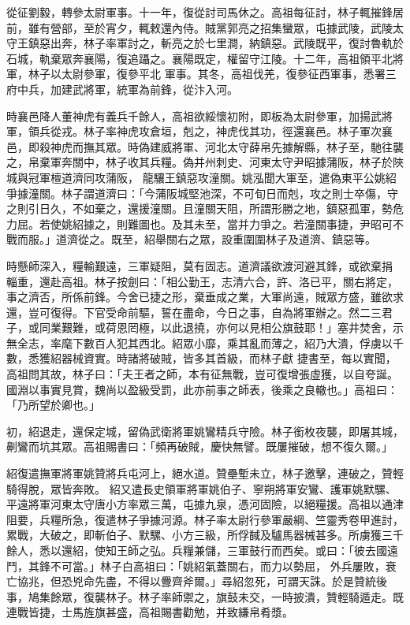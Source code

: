 \begin{pinyinscope}
 從征劉毅，轉參太尉軍事。十一年，復從討司馬休之。高祖每征討，林子輒摧鋒居前，雖有營部，至於宵夕，輒敕還內侍。賊黨郭亮之招集蠻眾，屯據武陵，武陵太守王鎮惡出奔，林子率軍討之，斬亮之於七里澗，納鎮惡。武陵既平，復討魯軌於石城，軌棄眾奔襄陽，復追躡之。襄陽既定，權留守江陵。十二年，高祖領平北將軍，林子以太尉參軍，復參平北
 軍事。其冬，高祖伐羌，復參征西軍事，悉署三府中兵，加建武將軍，統軍為前鋒，從汴入河。



 時襄邑降人董神虎有義兵千餘人，高祖欲綏懷初附，即板為太尉參軍，加揚武將軍，領兵從戎。林子率神虎攻倉垣，剋之，神虎伐其功，徑還襄邑。林子軍次襄邑，即殺神虎而撫其眾。時偽建威將軍、河北太守薛帛先據解縣，林子至，馳往襲之，帛棄軍奔關中，林子收其兵糧。偽并州刺史、河東太守尹昭據蒲阪，林子於陜城與冠軍檀道濟同攻蒲阪，
 龍驤王鎮惡攻潼關。姚泓聞大軍至，遣偽東平公姚紹爭據潼關。林子謂道濟曰：「今蒲阪城堅池深，不可旬日而剋，攻之則士卒傷，守之則引日久，不如棄之，還援潼關。且潼關天阻，所謂形勝之地，鎮惡孤軍，勢危力屈。若使姚紹據之，則難圖也。及其未至，當并力爭之。若潼關事捷，尹昭可不戰而服。」道濟從之。既至，紹舉關右之眾，設重圍圍林子及道濟、鎮惡等。



 時懸師深入，糧輸艱遠，三軍疑阻，莫有固志。道濟議欲渡河避其鋒，或欲棄捐
 輜重，還赴高祖。林子按劍曰：「相公勤王，志清六合，許、洛已平，關右將定，事之濟否，所係前鋒。今舍已捷之形，棄垂成之業，大軍尚遠，賊眾方盛，雖欲求還，豈可復得。下官受命前驅，誓在盡命，今日之事，自為將軍辦之。然二三君子，或同業艱難，或荷恩罔極，以此退撓，亦何以見相公旗鼓耶！」塞井焚舍，示無全志，率麾下數百人犯其西北。紹眾小靡，乘其亂而薄之，紹乃大潰，俘虜以千數，悉獲紹器械資實。時諸將破賊，皆多其首級，而林子獻
 捷書至，每以實聞，高祖問其故，林子曰：「夫王者之師，本有征無戰，豈可復增張虛獲，以自夸誕。國淵以事實見賞，魏尚以盈級受罰，此亦前事之師表，後乘之良轍也。」高祖曰：「乃所望於卿也。」



 初，紹退走，還保定城，留偽武衛將軍姚鸞精兵守險。林子銜枚夜襲，即屠其城，劓鸞而坑其眾。高祖賜書曰：「頻再破賊，慶快無譬。既屢摧破，想不復久爾。」



 紹復遣撫軍將軍姚贊將兵屯河上，絕水道。贊壘塹未立，林子邀擊，連破之，贊輕騎得脫，眾皆奔敗。
 紹又遣長史領軍將軍姚伯子、寧朔將軍安鸞、護軍姚默騾、平遠將軍河東太守唐小方率眾三萬，屯據九泉，憑河固險，以絕糧援。高祖以通津阻要，兵糧所急，復遣林子爭據河源。林子率太尉行參軍嚴綱、竺靈秀卷甲進討，累戰，大破之，即斬伯子、默騾、小方三級，所俘馘及驢馬器械甚多。所虜獲三千餘人，悉以還紹，使知王師之弘。兵糧兼儲，三軍鼓行而西矣。或曰：「彼去國遠鬥，其鋒不可當。」林子白高祖曰：「姚紹氣蓋關右，而力以勢屈，
 外兵屢敗，衰亡協兆，但恐兇命先盡，不得以釁齊斧爾。」尋紹忽死，可謂天誅。於是贊統後事，鳩集餘眾，復襲林子。林子率師禦之，旗鼓未交，一時披潰，贊輕騎遁走。既連戰皆捷，士馬旌旗甚盛，高祖賜書勸勉，并致縑帛肴漿。




\end{pinyinscope}
